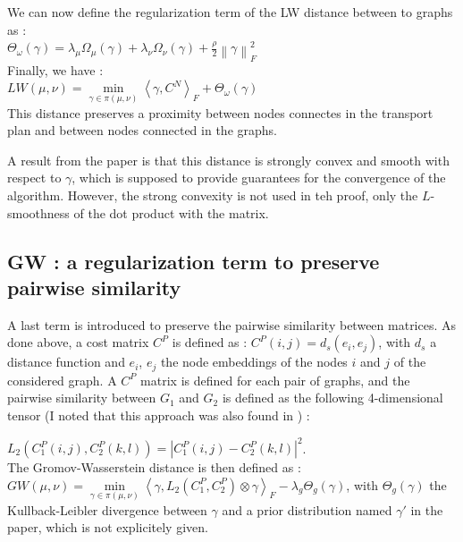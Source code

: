 \documentclass[a4paper,11pt]{article}
\begin{document}
We can now define the regularization term of the LW distance between to graphs as : \\
$\Theta_\omega(\gamma) = \lambda_\mu \Omega_\mu(\gamma) + \lambda_\nu \Omega_\nu(\gamma) + \frac{\rho}{2} \left\lVert \gamma \right\rVert _F^2 $\\

Finally, we have : \\

$LW(\mu, \nu) = \underset{\gamma \in \pi(\mu, \nu)}{\operatorname{min}} {\left\langle \gamma , C^N \right\rangle}_F + \Theta_\omega(\gamma)$\\


This distance preserves a proximity between nodes connectes in the transport plan and between nodes connected in the graphs.


A result from the paper is that this distance is strongly convex and smooth with respect to $\gamma$, which is supposed to provide guarantees for the convergence of the algorithm.
However, the strong convexity is not used in teh proof, only the $L$-smoothness of the dot product with the matrix. \\


\subsection{GW : a regularization term to preserve pairwise similarity}
\label{GW}
A last term is introduced to preserve the pairwise similarity between matrices. 
As done above, a cost matrix $C^P$ is defined as : $C^P(i,j) = d_s(e_i, e_j)$, with $d_s$ a distance function and $e_i$, $e_j$ the node embeddings of the nodes $i$ and $j$ of the considered graph. 
A $C^P$ matrix is defined for each pair of graphs, and the pairwise similarity between $G_1$ and $G_2$ is defined as the following 4-dimensional tensor (I noted that this approach was also found in \cite{titouan2019optimal}) : 

$L_2(C_1^P(i,j), C_2^P(k,l)) = \left\lvert C_1^P(i,j) - C_2^P(k,l) \right\rvert ^2 $. \\

The Gromov-Wasserstein distance is then defined as : \\

$GW(\mu, \nu) = \underset{\gamma \in \pi(\mu, \nu)}{\operatorname{min}} {\left\langle \gamma , L_2(C_1^P, C_2^P) \otimes \gamma \right\rangle}_F - \lambda_g \Theta_g(\gamma)$, with $\Theta_g(\gamma) $ the Kullback-Leibler divergence between $\gamma$ and a prior distribution named $\gamma '$ in the paper, which is not explicitely given. 
\end{document}
